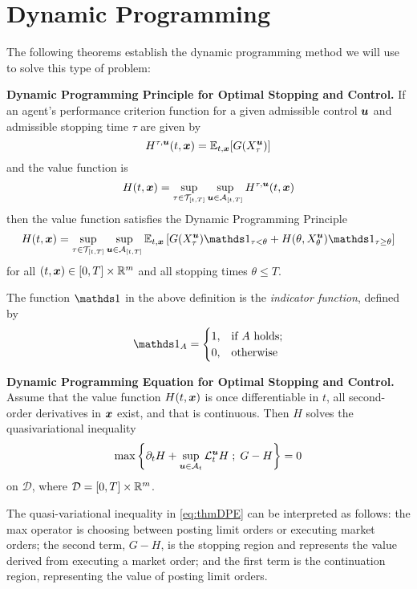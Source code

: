 \section{Dynamic Programming}
The following theorems establish the dynamic programming method we will use to solve this type of problem:
\begin{thm}{\bf Dynamic Programming Principle for Optimal Stopping and Control.} \citep{STA4505} If an agent's performance criterion function for a given admissible control $\bm{u}$ and admissible stopping time $\tau$ are given by
\[ H^{\tau, \bm{u}}(t,\bm{x}) = \mathbb{E}_{t,\bm{x}} [ G (X^{\bm{u}}_\tau)] \]
and the value function is
\[ H(t,\bm{x}) = \sup\limits_{\tau \in \mathcal{T}_{[t,T]}} \sup\limits_{\bm{u} \in \mathcal{A}_{[t,T]}} H^{\tau, \bm{u}}(t,\bm{x}) \]
then the value function satisfies the Dynamic Programming Principle
\begin{equation}\label{eq:thmDPP}
H(t,\bx) = \sup\limits_{\tau \in \mathcal{T}_{[t,T]}} \sup\limits_{\bu \in \cA_{[t,T]}} \E_{t,\bx} \left[ G (X^{\bu}_\tau) \indicator_{\tau<\theta} + H(\theta, X^{\bu}_\theta)\indicator_{\tau \geq \theta} \right]
\end{equation}
for all $(t,\bm{x}) \in [0,T] \times \mathbb{R}^m$ and all stopping times $\theta \leq T$.
\end{thm}
The function $\indicator$ in the above definition is the \emph{indicator function}, defined by
\begin{equation}
\indicator_A = \begin{cases} 1, & \text{if $A$ holds;} \\ 0, & \text{otherwise} \end{cases}
\end{equation}
\begin{thm}{\bf Dynamic Programming Equation for Optimal Stopping and Control.} \citep{STA4505} Assume that the value function $H(t,\bm{x})$ is once differentiable in $t$, all second-order derivatives in $\bm{x}$ exist, and that  is continuous. Then $H$ solves the quasivariational inequality
\begin{equation}\label{eq:thmDPE}
\max \left\lbrace \partial_t H + \sup \limits_{\bm{u} \in \mathcal{A}_t} \mathcal{L}^{\bm{u}}_t H \; ; \; G - H \right\rbrace = 0
\end{equation}
on $\mathcal{D}$, where $\mathcal{D} = [0,T] \times \mathbb{R}^m$.
\end{thm}
The quasi-variational inequality in \autoref{eq:thmDPE} can be interpreted as follows: the max operator is choosing between posting limit orders or executing market orders; the second term, $G-H$, is the stopping region and represents the value derived from executing a market order; and the first term is the continuation region, representing the value of posting limit orders.

